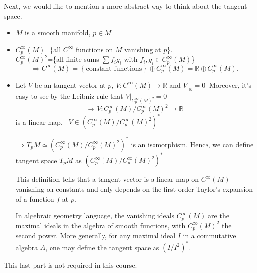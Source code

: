 Next, we would like to mention a more abstract way to think 
about the tangent space.
\begin{itemize}
    \item \(M\) is a smooth manifold, \(p\in M\)
    \item \(C_p^\infty(M)\)=\{all \(C^\infty\) functions
    on \(M\) vanishing at \(p\)\}.\\
    \(C_p^\infty(M)^2\)=\{all finite sums 
    \(\sum f_i g_i \) with \(f_i,g_i\in C_p^\infty(M)\)\}
    \[
        \Rightarrow C^\infty(M)=
        \left\{\text{constant functions}\right\}\oplus 
        C^\infty_p(M)=\mathbb{R}\oplus C^\infty_p(M).     
    \]
    \item Let \(V\) be an tangent vector at \(p\), 
    \(V\colon C^\infty(M)\to \mathbb{R}\) and \(V|_{\mathbb{R}}=0\).
    Moreover, it's easy to see by the Leibniz rule that 
    \(V|_{C_p^\infty(M)^2}=0\)
    \[
          \Rightarrow V\colon C_p^\infty(M)/C_p^\infty(M)^2
          \to \mathbb{R}
    \]
    is a linear map, \ie\ \(V\in 
    \left(C_p^\infty(M)/C_p^\infty(M)^2\right)^*\)

    \(\Rightarrow T_p M\simeq 
    \left(C_p^\infty(M)/C_p^\infty(M)^2\right)^*\)
    is an isomorphism. Hence, we can define tangent space
    \(T_p M\) as 
    \(\left(C_p^\infty(M)/C_p^\infty(M)^2\right)^*\)

    This definition tells that a tangent vector is a linear map 
    on \(C^\infty(M)\) vanishing on constants and only depends 
    on the first order Taylor's expansion of a function \(f\)
    at \(p\).

    In algebraic geometry language, the vanishing ideals 
    \(C^\infty_p(M)\) are the maximal ideals in the algebra
     of smooth functions, with \(C_p^\infty(M)^2\) the second
     power. More generally, for any maximal ideal \(I\) in a 
     commutative algebra \(A\), one may define the tangent space as 
    \(\left(I/I^2\right)^*\).
\end{itemize}
\begin{remark}
    This last part is not required in this course.
\end{remark}